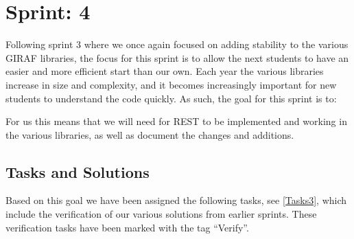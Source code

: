 \chapter{Sprint: 4}

Following sprint 3 where we once again focused on adding stability to the
various GIRAF libraries, the focus for this sprint is to allow the next students
to have an easier and more efficient start than our own. Each year the various
libraries increase in size and complexity, and it becomes increasingly
important for new students to understand the code quickly. As such, the goal
for this sprint is to:

\nl

For us this means that we will need for REST to be implemented and working
in the various libraries, as well as document the changes and additions.


\section{Tasks and Solutions}
Based on this goal we have been assigned the following tasks, see
\autoref{Tasks3}, which include the verification of our various solutions from
earlier sprints. These verification tasks have been marked with the tag
``Verify''.

